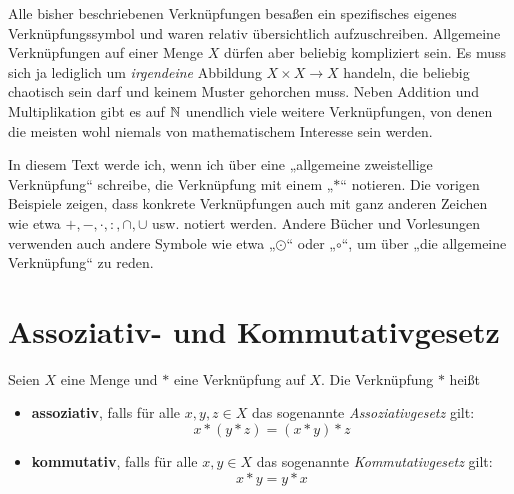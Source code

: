 \begin{bem}
    Alle bisher beschriebenen Verknüpfungen besaßen ein spezifisches eigenes Verknüpfungssymbol und waren relativ übersichtlich aufzuschreiben. Allgemeine Verknüpfungen auf einer Menge $X$ dürfen aber beliebig kompliziert sein. Es muss sich ja lediglich um \emph{irgendeine} Abbildung $X\times X\to X$ handeln, die beliebig chaotisch sein darf und keinem Muster gehorchen muss. Neben Addition und Multiplikation gibt es auf $\mathbb N$ unendlich viele weitere Verknüpfungen, von denen die meisten wohl niemals von mathematischem Interesse sein werden.
\end{bem}


\begin{nota}[Verknüpfungssymbole]
    In diesem Text werde ich, wenn ich über eine „allgemeine zweistellige Verknüpfung“ schreibe, die Verknüpfung mit einem „$*$“ notieren. Die vorigen Beispiele zeigen, dass konkrete Verknüpfungen auch mit ganz anderen Zeichen wie etwa $+,-,\cdot,:,\cap,\cup$ usw. notiert werden. Andere Bücher und Vorlesungen verwenden auch andere Symbole wie etwa „$\odot$“ oder „$\circ$“, um über „die allgemeine Verknüpfung“ zu reden.
\end{nota}





\section{Assoziativ- und Kommutativgesetz}


\begin{defin}  
    Seien $X$ eine Menge und $*$ eine Verknüpfung auf $X$. Die Verknüpfung $*$ heißt
    \begin{itemize}
        \item \textbf{assoziativ}, falls für alle $x,y,z\in X$ das sogenannte \emph{Assoziativgesetz} gilt:
            \[ x*(y*z) = (x*y)*z \]
        \item \textbf{kommutativ}, falls für alle $x,y\in X$ das sogenannte \emph{Kommutativgesetz} gilt:
            \[ x*y = y*x \]
    \end{itemize}
\end{defin}


